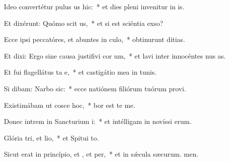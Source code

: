 \item Ideo convertétur pulus us hic:~* et dies pleni invenitur in is.
\item Et dixérunt: Quómo scit us,~* et si est sciéntia  exso?
\item Ecce ipsi peccatóres, et abuntes in culo,~* obtinurunt ditias.
\item Et dixi: Ergo sine causa justifivi cor um,~* et lavi inter innocéntes nus as.
\item Et fui flagellátus ta e,~* et castigátio mea in tunis.
\item Si dibam: Narbo sic:~* ecce natiónem filiórum tuórum provi.
\item Existimábam ut cosce hoc,~* bor est te me.
\item Donec intrem in Sancturium i:~* et intélligam in novíssi erum.
\item Glória tri, et lio,~* et Spitui to.
\item Sicut erat in princípio, et , et per,~* et in sǽcula sæcurum. men.
